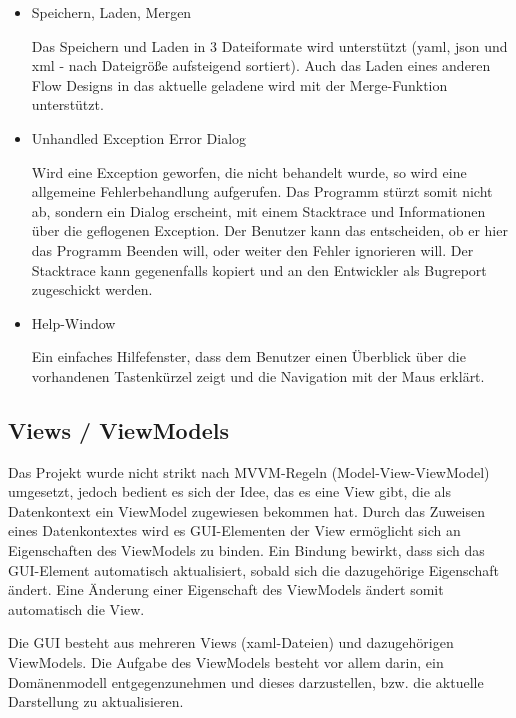 	\begin{itemize}
		\item Speichern, Laden, Mergen
		
		Das Speichern und Laden in 3 Dateiformate wird unterstützt
		(yaml, json und xml - nach Dateigröße aufsteigend sortiert).
		Auch das Laden eines anderen Flow Designs in das aktuelle geladene wird 
		mit der Merge-Funktion unterstützt.

		\item Unhandled Exception Error Dialog
		
		Wird eine Exception geworfen, die nicht behandelt wurde, so wird eine
		allgemeine Fehlerbehandlung aufgerufen. Das Programm stürzt somit nicht ab,
		sondern ein Dialog erscheint, mit einem Stacktrace und Informationen
		über die geflogenen Exception. Der Benutzer kann das entscheiden, ob er
		hier das Programm Beenden will, oder weiter den Fehler ignorieren will.
		Der Stacktrace kann gegenenfalls kopiert und an den Entwickler als
		Bugreport zugeschickt werden.
		
		\item Help-Window
		
		Ein einfaches Hilfefenster, dass dem Benutzer einen Überblick über die
		vorhandenen Tastenkürzel zeigt und die Navigation mit der Maus erklärt.
	\end{itemize}
	



\subsection{Views / ViewModels}

Das Projekt wurde nicht strikt nach MVVM-Regeln (Model-View-ViewModel) 
umgesetzt, jedoch bedient es sich der Idee, das es eine View gibt, die
als Datenkontext ein ViewModel zugewiesen bekommen hat. Durch das Zuweisen eines
Datenkontextes wird es GUI-Elementen der View ermöglicht sich an Eigenschaften des ViewModels zu
binden. Ein Bindung bewirkt, dass sich das GUI-Element automatisch aktualisiert,
sobald sich die dazugehörige Eigenschaft ändert. Eine Änderung einer
Eigenschaft des ViewModels ändert somit automatisch die View.

Die GUI besteht aus mehreren Views (xaml-Dateien) und dazugehörigen ViewModels.
Die Aufgabe des ViewModels besteht vor allem darin, ein Domänenmodell entgegenzunehmen und dieses
darzustellen, bzw. die aktuelle Darstellung zu aktualisieren.

